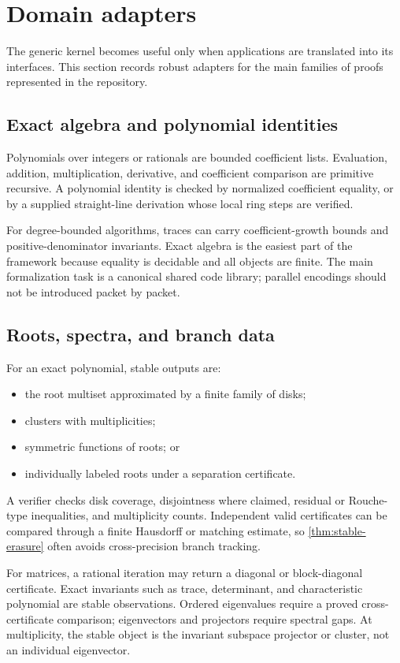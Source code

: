 \section{Domain adapters}
\label{sec:domains}

The generic kernel becomes useful only when applications are translated into
its interfaces.  This section records robust adapters for the main families of
proofs represented in the repository.

\subsection{Exact algebra and polynomial identities}

Polynomials over integers or rationals are bounded coefficient lists.
Evaluation, addition, multiplication, derivative, and coefficient comparison
are primitive recursive.  A polynomial identity is checked by normalized
coefficient equality, or by a supplied straight-line derivation whose local
ring steps are verified.

For degree-bounded algorithms, traces can carry coefficient-growth bounds and
positive-denominator invariants.  Exact algebra is the easiest part of the
framework because equality is decidable and all objects are finite.  The main
formalization task is a canonical shared code library; parallel encodings
should not be introduced packet by packet.

\subsection{Roots, spectra, and branch data}

For an exact polynomial, stable outputs are:
\begin{itemize}
\item the root multiset approximated by a finite family of disks;
\item clusters with multiplicities;
\item symmetric functions of roots; or
\item individually labeled roots under a separation certificate.
\end{itemize}
A verifier checks disk coverage, disjointness where claimed, residual or
Rouche-type inequalities, and multiplicity counts.  Independent valid
certificates can be compared through a finite Hausdorff or matching estimate,
so \cref{thm:stable-erasure} often avoids cross-precision branch tracking.

For matrices, a rational iteration may return a diagonal or block-diagonal
certificate.  Exact invariants such as trace, determinant, and characteristic
polynomial are stable observations.  Ordered eigenvalues require a proved
cross-certificate comparison; eigenvectors and projectors require spectral
gaps.  At multiplicity, the stable object is the invariant subspace projector
or cluster, not an individual eigenvector.

